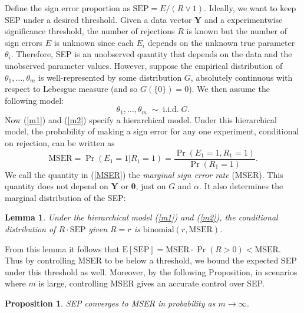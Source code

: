 \documentclass[11pt]{article}
\newcommand{\Exp}[1]{{\text{E}}[ \ensuremath{ #1 } ]  }
\newtheorem{lemma}[theorem]{Lemma}
\newtheorem{proposition}{Proposition}[section]
\begin{document}
Define the sign error proportion as $\text{SEP} = E/(R \lor 1)$. Ideally, we want to keep SEP under a desired threshold. Given a data vector $\boldsymbol{Y}$ and a experimentwise significance threshold,  the number of rejections $R$ is known but the number of sign errors $E$ is unknown since each $E_i$ depends on the unknown true parameter $\theta_i$. Therefore, SEP is an unobserved quantity that depends on the data and the unobserved parameter values. 
However, suppose the empirical distribution of $\theta_1,\ldots, \theta_m$ is well-represented by some distribution $G$, absolutely continuous with respect to 
Lebesgue measure (and so $G(\{ 0\} ) =0$). We then assume the following model:
\begin{equation}
\theta_1,\ldots, \theta_m \;  \sim \; \text{i.i.d.}\;  G.
\label{m2}
\end{equation} 
Now (\ref{m1}) and (\ref{m2}) specify a hierarchical model. Under this hierarchical model, the probability of making a sign error for any one experiment, conditional on rejection, can be written as
\begin{equation}
\text{MSER} = \Pr( E_1=1|R_1=1 ) =\frac{\Pr(E_1=1,R_1=1)}{\Pr(R_1=1)}.
\label{MSER}
\end{equation}
We call the quantity in (\ref{MSER}) the \textit{marginal sign error rate} (MSER). This quantity does not depend on $\boldsymbol{Y}$ or $\boldsymbol{\theta}$, just on $G$ and $\alpha$. It also determines the marginal 
distribution of the SEP:
\begin{lemma}
	Under the hierarchical  model (\ref{m1}) and (\ref{m2}),   
the conditional distribution of $R\cdot \text{SEP}$ given $R=r$ is 
$\text{binomial}(r,\text{MSER})$. 
	\label{lemma:bi}
\end{lemma}
From this lemma it follows that $\Exp{\text{SEP}}  = \text{MSER} \cdot \Pr(R>0)  < \text{MSER}$. Thus by controlling MSER to be below a threshold, we bound the expected SEP under this  threshold as well. Moreover, by the following Proposition, in scenarios where $m$ is large, controlling MSER gives an accurate control over SEP.
\begin{proposition}
	 SEP converges to MSER in probability as $m \to \infty$.
	\label{coro:septomser}
\end{proposition}
\end{document}
